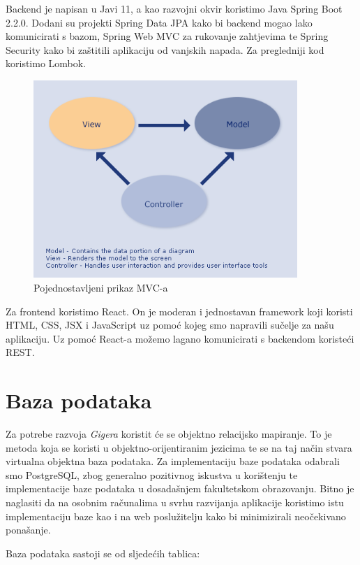 	Backend je napisan u Javi 11, a kao razvojni okvir koristimo Java Spring Boot 2.2.0. Dodani su projekti Spring Data JPA kako bi backend mogao lako komunicirati s bazom, Spring Web MVC za rukovanje zahtjevima te Spring Security kako bi zaštitili aplikaciju od vanjskih napada. Za pregledniji kod koristimo Lombok.

	\begin{figure}[H]
		\begin{center}
			\includegraphics[width=10cm]{slike/mvc.PNG}
		\end{center}
		\caption{Pojednostavljeni prikaz MVC-a}
		\label{fig:mvc}
	\end{figure}

	Za frontend koristimo React. On je moderan i jednostavan framework koji koristi HTML, CSS, JSX i JavaScript uz pomoć kojeg smo napravili sučelje za našu aplikaciju. Uz pomoć React-a možemo lagano komunicirati s backendom koristeći REST.\\




		\section{Baza podataka}
		Za potrebe razvoja \textit{Gigera} koristit će se objektno relacijsko mapiranje. To je metoda koja se koristi u objektno-orijentiranim jezicima te se na taj način stvara virtualna objektna baza podataka. Za implementaciju baze podataka odabrali smo PostgreSQL, zbog generalno pozitivnog iskustva u korištenju te implementacije baze podataka u dosadašnjem fakultetskom obrazovanju. Bitno je naglasiti da na osobnim računalima u svrhu razvijanja aplikacije koristimo istu implementaciju baze kao i na web poslužitelju kako bi minimizirali neočekivano ponašanje.
		
		Baza podataka sastoji se od sljedećih tablica:
		

